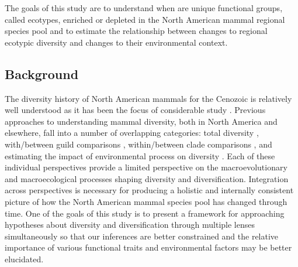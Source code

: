 \documentclass[12pt,letterpaper]{article}
\begin{document}
The goals of this study are to understand when are unique functional groups, called ecotypes, enriched or depleted in the North American mammal regional species pool and to estimate the relationship between changes to regional ecotypic diversity and changes to their environmental context.

\subsection*{Background}

The diversity history of North American mammals for the Cenozoic is relatively well understood as it has been the focus of considerable study \citep{Alroy2009,Alroy1996a,Janis1993b,Alroy2000g,Figueirido2012,Pires2015a,Fraser2015a,Smits2015b,Quental2013,Slater2015c,Silvestro2015b,Badgley2013,Blois2009,Janis1993c}. Previous approaches to understanding mammal diversity, both in North America and elsewhere, fall into a number of overlapping categories: total diversity \citep{Alroy2000g,Alroy1996a,Figueirido2012,Liow2008}, with/between guild comparisons \citep{Janis2004,Janis2000,Jernvall2004,Janis1993c,Pires2015a,Janis2008a}, within/between clade comparisons \citep{Quental2013,Slater2015c,Silvestro2015b,Fraser2015a,Cantalapiedra2017}, and estimating the impact of environmental process on diversity \citep{Blois2009,Janis1993c,Janis1993b,Fraser2015a,Eronen2015,Badgley2013,Badgley2017,Alroy2000g}. Each of these individual perspectives provide a limited perspective on the macroevolutionary and macroecological processes shaping diversity and diversification. Integration across perspectives is necessary for producing a holistic and internally consistent picture of how the North American mammal species pool has changed through time. One of the goals of this study is to present a framework for approaching hypotheses about diversity and diversification through multiple lenses simultaneously so that our inferences are better constrained and the relative importance of various functional traits and environmental factors may be better elucidated.
\end{document}
